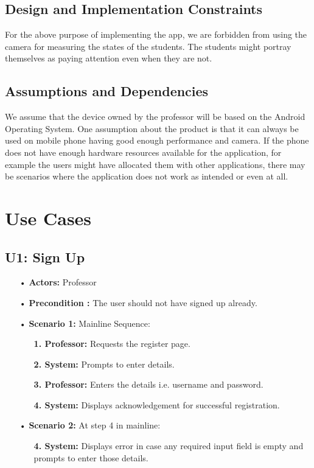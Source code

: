 \documentclass{scrreprt}
\begin{document}
\section{Design and Implementation Constraints}
For the above purpose of implementing the app, we are forbidden from using the camera
for measuring the states of the students. The students might portray themselves as paying attention even when they are not.

\section{Assumptions and Dependencies}
We assume that the device owned by the professor will be based on the
Android Operating System.
One assumption about the product is that it can always be used on mobile phone having good enough performance and camera. If the phone does not have enough hardware resources
available for the application, for example the users might have allocated them with other
applications, there may be scenarios where the application does not work as intended
or even at all.

\chapter{Use Cases}
\section{U1: Sign Up}
\begin{itemize}
\item[•]
\textbf{Actors:} Professor
\item[•] \textbf{Precondition :} The user should not have signed up already.
\item[•]
\textbf{Scenario 1:} Mainline Sequence:
\begin{itemize}
  \item [] \textbf{1. Professor:} Requests the register page.
  \item [] \textbf{2. System:} Prompts to enter details.
  \item [] \textbf{3. Professor:} Enters the details i.e. username and password.
  \item [] \textbf{4. System:} Displays acknowledgement for successful registration.
\end{itemize}
\item[•]
\textbf{Scenario 2:} At step 4 in mainline:
\begin{itemize}
  \item [] \textbf{4. System:} Displays error in case any required input field is empty and prompts to enter those details.
\end{itemize}
\end{itemize}
\end{document}
